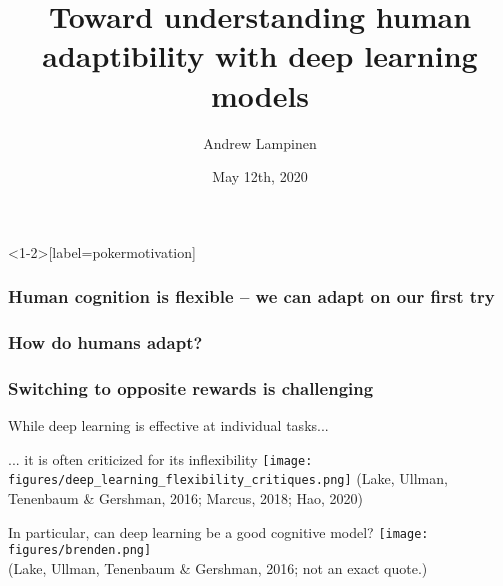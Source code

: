 \documentclass{beamer}
\begin{document}
\title{Toward understanding human adaptibility with deep learning models}
\author{Andrew Lampinen}
\date{May 12th, 2020}
\frame{\titlepage}


\begin{frame}<1-2>[label=pokermotivation]
\frametitle<1-2>{Human cognition is flexible -- we can adapt on our first try}
\frametitle<3-4>{How do humans adapt?}
\frametitle<5>{Switching to opposite rewards is challenging}
\centering
{}
\end{frame}

\begin{frame}{While deep learning is effective at individual tasks...}
\centering
{}
\end{frame}

\begin{frame}{... it is often criticized for its inflexibility}
\texttt{[image: figures/deep\_learning\_flexibility\_critiques.png]}
{\scriptsize (Lake, Ullman, Tenenbaum \& Gershman, 2016; Marcus, 2018; Hao, 2020)}
\end{frame}

\begin{frame}{In particular, can deep learning be a good cognitive model?}
\phantom{}
{
\centering
\texttt{[image: figures/brenden.png]}\\
}
{\scriptsize (Lake, Ullman, Tenenbaum \& Gershman, 2016; not an exact quote.)}
\end{frame}
\end{document}
